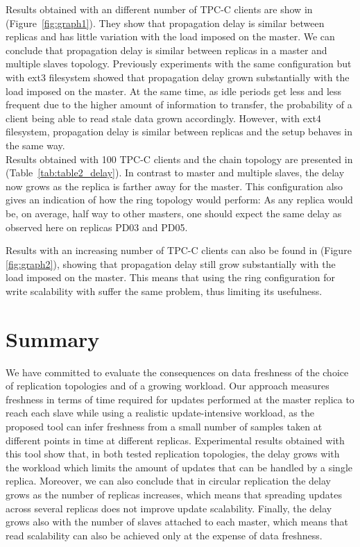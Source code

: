 Results obtained with an different number of TPC-C clients are show in (Figure~\ref{fig:graph1}). They show that propagation delay is similar between replicas and has little variation with the load imposed on the master. We can conclude that propagation delay is similar between replicas in a master and multiple slaves topology.
Previously experiments with the same configuration but with ext3 filesystem showed that propagation delay grown substantially with the load imposed on the master. At the same time, as idle periods get less and less frequent due to the higher amount of information to transfer, the probability of a client being able to read stale data grown accordingly. However, with ext4 filesystem, propagation delay is similar between replicas and the setup behaves in the same way.\\

\vspace{10mm}
Results obtained with 100 TPC-C clients and the chain topology are presented in (Table~\ref{tab:table2_delay}). In contrast to master and multiple slaves, the delay now grows as the replica is farther away for the master. This configuration also gives an indication of how the ring topology would perform: As any replica would be, on average, half way to other masters, one should expect the same delay as observed here on replicas PD03 and PD05.

Results with an increasing number of TPC-C clients can also be found in (Figure \ref{fig:graph2}),  showing that propagation delay still grow substantially with the load imposed on the master. This means that using the ring configuration for write scalability with suffer the same problem, thus limiting its usefulness.



\section{Summary}

We have committed to evaluate the consequences on data freshness of the choice of replication topologies and of a growing workload. Our approach measures freshness in terms of time required for updates performed at the master replica to reach each slave while using a realistic update-intensive workload, as the proposed tool can infer freshness from a small number of samples taken at different points in time at different replicas. Experimental results obtained with this tool show that, in both tested replication topologies, the delay grows with the workload which limits the amount of updates that can be handled by a single replica. Moreover, we can also conclude that in circular replication the delay grows as the number of replicas increases, which means that spreading updates across several replicas does not improve update scalability. Finally, the delay grows also with the number of slaves attached to each master, which means that read scalability can also be achieved only at the expense of data freshness.


